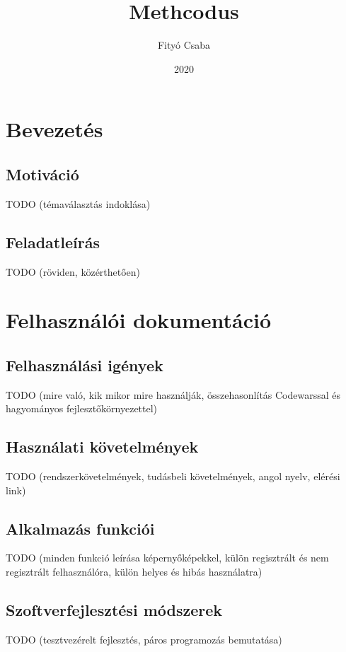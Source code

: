 \documentclass{elteikthesis}
\title{Methcodus}
\date{2020}
\author{Fityó Csaba}
\affiliation{mesteroktató}
\begin{document}

	\maketitle

	\tableofcontents

	\chapter{Bevezetés}

		\section{Motiváció}
		TODO (témaválasztás indoklása)

		\section{Feladatleírás}
		TODO (röviden, közérthetően)

	\chapter{Felhasználói dokumentáció}

		\section{Felhasználási igények}
		TODO (mire való, kik mikor mire használják, összehasonlítás Codewarssal és hagyományos fejlesztőkörnyezettel)
		
		\section{Használati követelmények}
		TODO (rendszerkövetelmények, tudásbeli követelmények, angol nyelv, elérési link)
		
		\section{Alkalmazás funkciói}
		TODO (minden funkció leírása képernyőképekkel, külön regisztrált és nem regisztrált felhasználóra, külön helyes és hibás használatra)
		
		\section{Szoftverfejlesztési módszerek}
		TODO (tesztvezérelt fejlesztés, páros programozás bemutatása)
\end{document}
